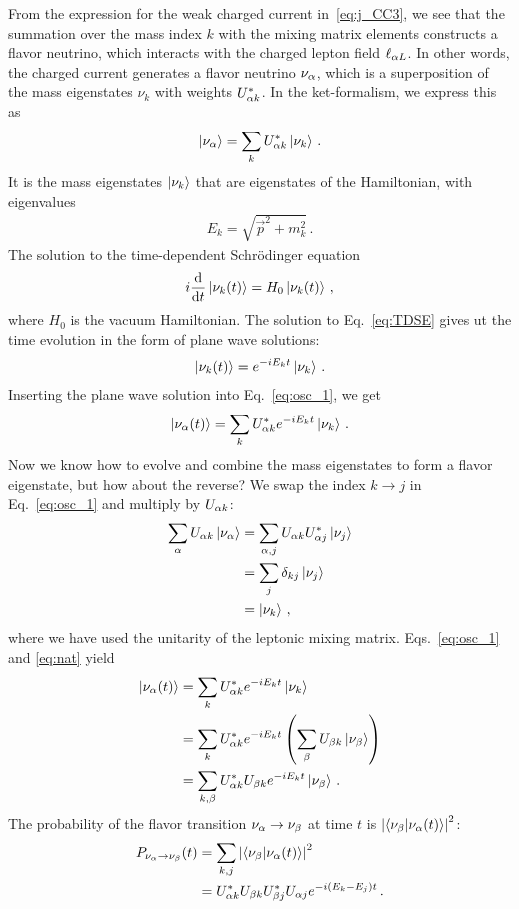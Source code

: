 From the expression for the weak charged current in~\ref{eq:j_CC3}, we see that the summation over the mass index $k$ with the mixing matrix elements constructs a flavor neutrino, which interacts with the charged lepton field $\ell_{\alpha L}$.
In other words, the charged current generates a flavor neutrino $\nu_\alpha$, which is a superposition of the mass eigenstates 
$\nu_k$ with weights $U_{\alpha k}^*$. In the ket-formalism, we express this as
\begin{align}\label{eq:osc_1}
    \ket{\nu_\alpha} = \sum_k U^*_{\alpha k} \ket{\nu_k}\,.
\end{align}
It is the mass eigenstates $\ket{\nu_k}$ that are eigenstates of the Hamiltonian, with eigenvalues
\begin{align}\label{eq:disp}
    E_k = \sqrt{\vec{p}^2 + m_k^2}\,.
\end{align}
The solution to the time-dependent Schrödinger equation 
\begin{align}\label{eq:TDSE}
    i \dv{}{t} \ket{\nu_k(t)} = H_0\ket{\nu_k(t)}\,,
\end{align}
where $H_0$ is the vacuum Hamiltonian. 
The solution to Eq.~\ref{eq:TDSE} gives ut the time evolution
in the form of plane wave solutions: 
\begin{align}
    \ket{\nu_k(t)} = e^{-iE_kt}\ket{\nu_k}\,.
\end{align}
Inserting the plane wave solution into Eq.~\ref{eq:osc_1}, we get 
\begin{align}\label{eq:nat}
    \ket{\nu_\alpha(t)} = \sum_k U^*_{\alpha k} e^{-iE_kt}\ket{\nu_k}\,.
\end{align}
Now we know how to evolve and combine the mass eigenstates to form a flavor eigenstate, but how about the reverse? We swap the index $k\to j$ in Eq.~\ref{eq:osc_1} and multiply by $U_{\alpha k}$:
\begin{align}\label{eq:osc_k}
    \sum_\alpha U_{\alpha k}\ket{\nu_\alpha} &= \sum_{\alpha, j} U_{\alpha k} U_{\alpha j}^* \ket{\nu_j} \nonumber \\
                              &= \sum_{j} \delta_{kj} \ket{\nu_j} \nonumber \\
                              &= \ket{\nu_k}\,,
\end{align}
where we have used the unitarity of the leptonic mixing matrix. Eqs.~\ref{eq:osc_1} and \ref{eq:nat} yield 
\begin{align}
    \ket{\nu_\alpha(t)} &= \sum_k U^*_{\alpha k} e^{-iE_kt}\ket{\nu_k} \nonumber \\
                 &= \sum_k U^*_{\alpha k} e^{-iE_kt}\left(\sum_\beta U_{\beta k}\ket{\nu_\beta}\right) \nonumber \\
                 &= \sum_{k,\beta} U^*_{\alpha k}U_{\beta k} e^{-iE_kt} \ket{\nu_\beta}\,.
\end{align}
The probability of the flavor transition $\nu_\alpha \to \nu_\beta$ at time $t$ is $\abs{\bra{\nu_\beta}\ket{\nu_\alpha (t)}}^2$:
\begin{align}
    P_{\nu_\alpha \to \nu_\beta}(t) &= \sum_{k,j} \abs{{\bra{\nu_\beta}\ket{\nu_\alpha (t)}}}^2 \nonumber \\
    &= U^*_{\alpha k}U_{\beta k}U^*_{\beta j}U_{\alpha j} e^{-i(E_k-E_j)t}\,.
\end{align}

